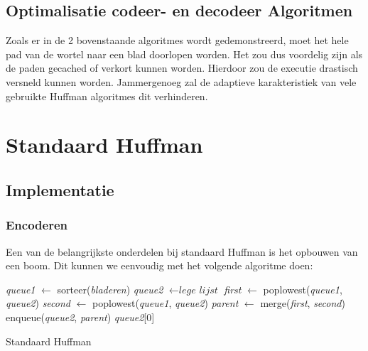 \documentclass[twoside,twocolumn]{article}
\begin{document}
    \subsection{Optimalisatie codeer- en decodeer Algoritmen}
        Zoals er in de 2 bovenstaande algoritmes wordt gedemonstreerd, moet het hele pad van de 
        wortel naar een blad doorlopen worden.
        Het zou dus voordelig zijn als de paden gecached of verkort kunnen worden. Hierdoor zou de 
        executie drastisch versneld kunnen worden.
        Jammergenoeg zal de adaptieve karakteristiek van vele gebruikte Huffman algoritmes dit verhinderen.
    
\section{Standaard Huffman}
    
    \subsection{Implementatie}
        \subsubsection{Encoderen}
          Een van de belangrijkste onderdelen bij standaard Huffman is het opbouwen van een boom.
          Dit kunnen we eenvoudig met het volgende algoritme doen:
          
            \begin{algorithm}
                \begin{algorithmic}[1]
                        \State \textit{queue1} $\gets$ sorteer(\textit{bladeren})
                        \State \textit{queue2} $\gets \textit{lege lijst}$
                        \State \textit{first} $\gets$ poplowest(\textit{queue1}, \textit{queue2}) 
                        \State \textit{second} $\gets$ poplowest(\textit{queue1}, \textit{queue2})
                        \State \textit{parent} $\gets$ merge(\textit{first}, \textit{second})
                        \State enqueue(\textit{queue2}, \textit{parent})
                        \EndWhile
                        \State
                        \State \Return \textit{queue2}[0]
                    \EndProcedure
                \end{algorithmic}
                \caption{Standaard Huffman}
                \label{alg:bouwboom}
            \end{algorithm}
        
\end{document}
